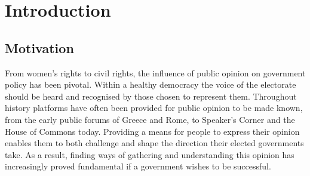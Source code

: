
\chapter{Introduction}


\section{Motivation}

From women's rights to civil rights, the influence of public opinion on government policy has been pivotal. Within a healthy democracy the voice of the electorate should be heard and recognised by those chosen to represent them. Throughout history platforms have often been provided for public opinion to be made known, from the early public forums of Greece and Rome, to Speaker's Corner and the House of Commons today. Providing a means for people to express their opinion enables them to both challenge and shape the direction their elected governments take. As a result, finding ways of gathering and understanding this opinion has increasingly proved fundamental if a government wishes to be successful.

